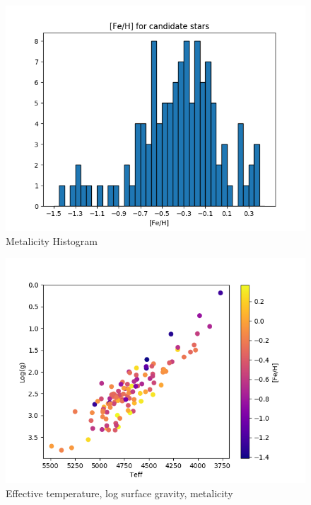 \documentclass[a4paper,fleqn,usenatbib]{mnras}
\begin{document}
\begin{figure}
	\includegraphics[width=\columnwidth]{histof113.png}
    \caption{Metalicity Histogram}
    \label{mhist}
\end{figure}


\begin{figure}
	\includegraphics[width=\columnwidth]{loggteffof113.png}
    \caption{Effective temperature, log surface gravity, metalicity}
    \label{mhist}
\end{figure}
\end{document}
